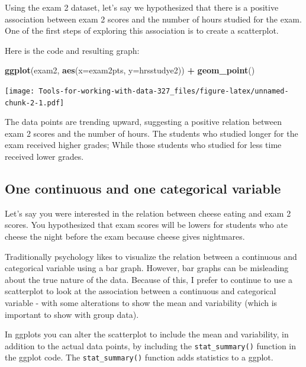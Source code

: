 \documentclass[
]{book}
\newenvironment{Shaded}{\begin{snugshade}}{\end{snugshade}}
\newcommand{\DataTypeTok}[1]{\textcolor[rgb]{0.13,0.29,0.53}{#1}}
\newcommand{\KeywordTok}[1]{\textcolor[rgb]{0.13,0.29,0.53}{\textbf{#1}}}
\newcommand{\NormalTok}[1]{#1}
\newcommand{\OperatorTok}[1]{\textcolor[rgb]{0.81,0.36,0.00}{\textbf{#1}}}
\newcommand{\StringTok}[1]{\textcolor[rgb]{0.31,0.60,0.02}{#1}}
\begin{document}
Using the exam 2 dataset, let's say we hypothesized that there is a positive association between exam 2 scores and the number of hours studied for the exam. One of the first steps of exploring this association is to create a scatterplot.

Here is the code and resulting graph:

\begin{Shaded}
\begin{Highlighting}[]
\KeywordTok{ggplot}\NormalTok{(exam2, }\KeywordTok{aes}\NormalTok{(}\DataTypeTok{x=}\NormalTok{exam2pts, }\DataTypeTok{y=}\NormalTok{hrsstudye2)) }\OperatorTok{+}
\StringTok{  }\KeywordTok{geom_point}\NormalTok{()}
\end{Highlighting}
\end{Shaded}

\texttt{[image: Tools-for-working-with-data-327\_files/figure-latex/unnamed-chunk-2-1.pdf]}

The data points are trending upward, suggesting a positive relation between exam 2 scores and the number of hours. The students who studied longer for the exam received higher grades; While those students who studied for less time received lower grades.

\hypertarget{one-continuous-and-one-categorical-variable}{%
\subsection{One continuous and one categorical variable}\label{one-continuous-and-one-categorical-variable}}

Let's say you were interested in the relation between cheese eating and exam 2 scores. You hypothesized that exam scores will be lowers for students who ate cheese the night before the exam because cheese gives nightmares.

Traditionally psychology likes to visualize the relation between a continuous and categorical variable using a bar graph. However, bar graphs can be misleading about the true nature of the data. Because of this, I prefer to continue to use a scatterplot to look at the association between a continuous and categorical variable - with some alterations to show the mean and variability (which is important to show with group data).

In ggplots you can alter the scatterplot to include the mean and variability, in addition to the actual data points, by including the \texttt{stat\_summary()} function in the ggplot code. The \texttt{stat\_summary()} function adds statistics to a ggplot.
\end{document}
